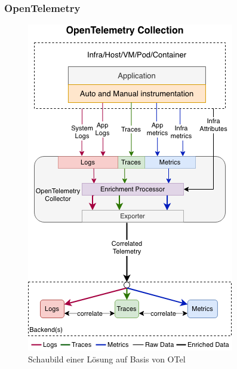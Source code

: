 \subsubsection{OpenTelemetry}

\begin{figure}
\centering
\vspace{-3\baselineskip}
\includegraphics[width=\linewidth]{img/03_methoden/otel_unified-collection_2.png}
\caption{Schaubild einer Lösung auf Basis von OTel \cite{OpenTelemetryUnifiedCollection}}
\label{fig:otel-unified-collection}
\end{figure}

